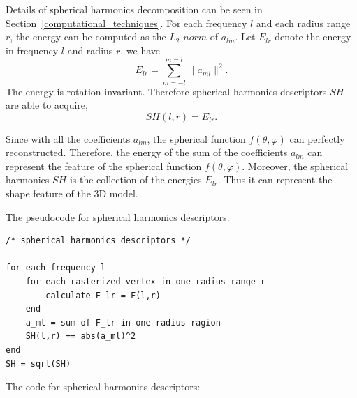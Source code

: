Details of spherical harmonics decomposition can be seen in Section~\ref{computational_techniques}. For each frequency $l$ and each radius range $r$, the energy can be computed as the $L_{2}$-$norm$ of $a_{lm}$. Let $E_{lr}$ denote the energy in frequency $l$ and radius $r$, we have
\begin{equation}
E_{lr}=\sum_{m=-l}^{m=l}\|a_{ml}\|^{2}.
\end{equation}
The energy is rotation invariant. Therefore spherical harmonics descriptors $SH$ are able to acquire,
\begin{equation}
SH(l,r) = E_{lr}.
\end{equation}

Since with all the coefficients $a_{lm}$, the spherical function $f(\theta,\varphi)$ can perfectly reconstructed. Therefore, the energy of the sum of the coefficients $a_{lm}$ can represent the feature of the spherical function $f(\theta,\varphi)$. Moreover, the spherical harmonics $SH$ is the collection of the energies $E_{lr}$. Thus it can represent the shape feature of the 3D model. 

The pseudocode for spherical harmonics descriptors:

\begin{lstlisting}[xleftmargin=1em]
/* spherical harmonics descriptors */

for each frequency l
    for each rasterized vertex in one radius range r 
        calculate F_lr = F(l,r)
    end
    a_ml = sum of F_lr in one radius ragion
    SH(l,r) += abs(a_ml)^2    
end
SH = sqrt(SH)
\end{lstlisting}

The code for spherical harmonics descriptors:

